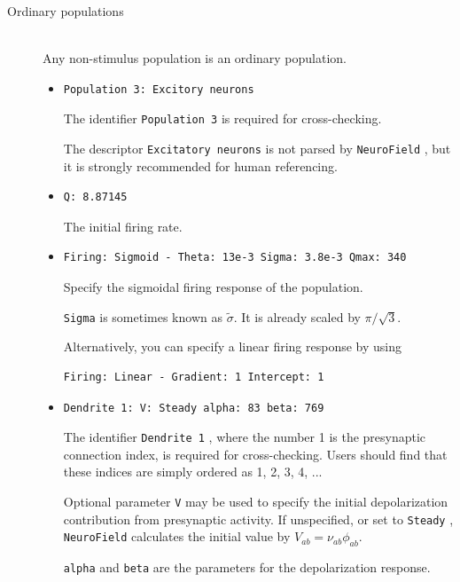 \documentclass[12pt,a4paper]{article}
\newcommand{\type}[1]{ {\small\small\tt #1} }
\newcommand{\NF}[0]{ \type{NeuroField}}
\begin{document}
\begin{description}
\begin{itemize}
	\end{itemize}
\item[Ordinary populations]\ \\
	Any non-stimulus population is an ordinary population.

	\begin{itemize}
	\item
	\begin{lstlisting}
Population 3: Excitory neurons
	\end{lstlisting}
	The identifier \type{Population 3} is required for cross-checking.
	
	The descriptor \type{Excitatory neurons} is not parsed by \NF, but it is strongly recommended for human referencing.
	\item
	\begin{lstlisting}
Q: 8.87145
	\end{lstlisting}
	The initial firing rate.
	\item
	\begin{lstlisting}
Firing: Sigmoid - Theta: 13e-3 Sigma: 3.8e-3 Qmax: 340
	\end{lstlisting}
	Specify the sigmoidal firing response of the population.

	\type{Sigma} is sometimes known as \(\tilde{\sigma}\). It is already scaled by \(\pi/\sqrt{3}\).

	Alternatively, you can specify a linear firing response by using
	\begin{lstlisting}
Firing: Linear - Gradient: 1 Intercept: 1
	\end{lstlisting}

	\item
	\begin{lstlisting}
Dendrite 1: V: Steady alpha: 83 beta: 769
	\end{lstlisting}
	The identifier \type{Dendrite 1}, where the number 1 is the presynaptic connection index, is required for cross-checking. Users should find that these indices are simply ordered as 1, 2, 3, 4, ...
	
	Optional parameter \type{V} may be used to specify the initial depolarization contribution from presynaptic activity. If unspecified, or set to \type{Steady}, \NF calculates the initial value by \(V_{ab}=\nu_{ab}\phi_{ab}\).

	\type{alpha} and \type{beta} are the parameters for the depolarization response.
	\end{itemize}
\end{description}
\end{document}
